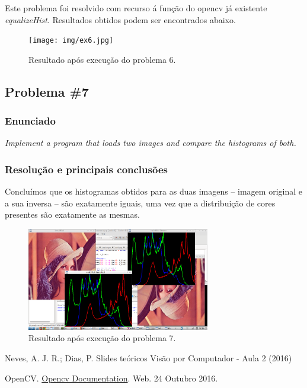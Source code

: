 \documentclass[portuguese, times, mirror]{revdetua}
\begin{document}
Este problema foi resolvido com recurso á função do opencv já existente \textit{equalizeHist}. Resultados obtidos podem ser encontrados abaixo.

\begin{figure}[ht!]
\centering
\texttt{[image: img/ex6.jpg]}
\caption{Resultado após execução do problema 6.}
\end{figure}

\subsection{Problema \#7}

\subsubsection{Enunciado}
\textit{Implement a program that loads two images and compare the histograms of both.}

\subsubsection{Resolução e principais conclusões}



Concluímos que os histogramas obtidos para as duas imagens – imagem original e a sua inversa – são exatamente iguais, uma vez que a distribuição de cores presentes são exatamente as mesmas.  


\begin{figure}[ht!]
\centering
\includegraphics[width=80mm]{img/ex7.png}
\caption{Resultado após execução do problema 7.}
\end{figure}



\begin{thebibliography}{1} %



Neves, A. J. R.; Dias, P. Slides teóricos Visão por Computador - Aula 2 (2016)


OpenCV. \href{hhttp://docs.opencv.org/}{Opencv Documentation}. Web. 24 Outubro 2016. 




\end{thebibliography}
\end{document}
